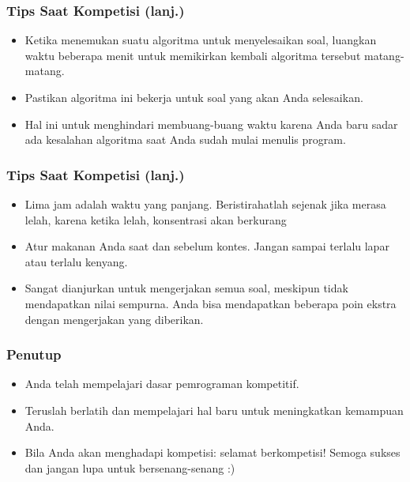 \begin{frame}
  \frametitle{Tips Saat Kompetisi (lanj.)}
  \begin{itemize}
    \item Ketika menemukan suatu algoritma untuk menyelesaikan soal, luangkan waktu beberapa menit untuk memikirkan kembali algoritma tersebut matang-matang. 
    \item Pastikan algoritma ini bekerja untuk soal yang akan Anda selesaikan. 
    \item Hal ini untuk menghindari membuang-buang waktu karena Anda baru sadar ada kesalahan algoritma saat Anda sudah mulai menulis program.
  \end{itemize}
\end{frame}


\begin{frame}
  \frametitle{Tips Saat Kompetisi (lanj.)}
  \begin{itemize}
    \item Lima jam adalah waktu yang panjang. Beristirahatlah sejenak jika merasa lelah, karena ketika lelah, konsentrasi akan berkurang
    \item Atur makanan Anda saat dan sebelum kontes. Jangan sampai terlalu lapar atau terlalu kenyang.
    \item Sangat dianjurkan untuk mengerjakan semua soal, meskipun tidak mendapatkan nilai sempurna. Anda bisa mendapatkan beberapa poin ekstra dengan mengerjakan  yang diberikan.
  \end{itemize}
\end{frame}

\begin{frame}
  \frametitle{Penutup}
  \begin{itemize}
    \item Anda telah mempelajari dasar pemrograman kompetitif.
    \item Teruslah berlatih dan mempelajari hal baru untuk meningkatkan kemampuan Anda.
    \item Bila Anda akan menghadapi kompetisi: selamat berkompetisi!\newline
    Semoga sukses dan jangan lupa untuk bersenang-senang :)
  \end{itemize}
\end{frame}


